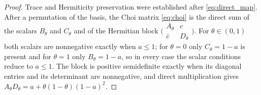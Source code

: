 \documentclass[pdflatex,sn-mathphys-num]{sn-jnl}
\theoremstyle{thmstyleone}
\theoremstyle{thmstylethree}
\theoremstyle{thmstyletwo}
\begin{document}
\begin{proof}
Trace and Hermiticity preservation were established after \eqref{eq:direct_map}. After a permutation of the basis, the Choi matrix \eqref{eq:choi} is the direct sum of the scalars $B_\theta$ and $C_\theta$ and of the Hermitian block $\big(\begin{smallmatrix}A_\theta&c\\ \bar c&D_\theta\end{smallmatrix}\big)$. For $\theta\in(0,1)$ both scalars are nonnegative exactly when $a\le1$; for $\theta=0$ only $C_\theta=1-a$ is present and for $\theta=1$ only $B_\theta=1-a$, so in every case the scalar conditions reduce to $a\le1$. The block is positive semidefinite exactly when its diagonal entries and its determinant are nonnegative, and direct multiplication gives $A_\theta D_\theta=a+\theta(1-\theta)(1-a)^2$.
\end{proof}
\end{document}
